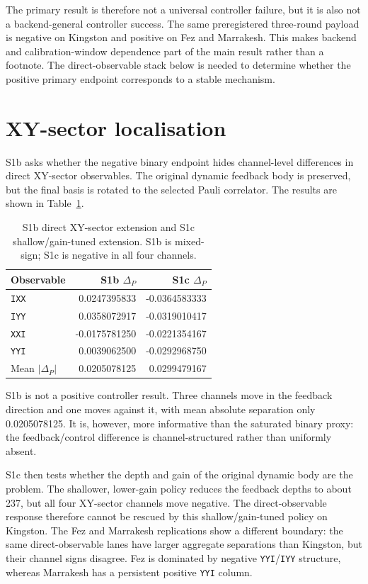 \documentclass[preprint,aps,physrev,superscriptaddress,floatfix,longbibliography]{revtex4-2}
\begin{document}
The primary result is therefore not a universal controller failure, but it is
also not a backend-general controller success. The same preregistered
three-round payload is negative on Kingston and positive on Fez and
Marrakesh. This makes backend and calibration-window dependence part of the
main result rather than a footnote. The direct-observable stack below is
needed to determine whether the positive primary endpoint corresponds to a
stable mechanism.

\section{XY-sector localisation}

S1b asks whether the negative binary endpoint hides channel-level differences
in direct XY-sector observables. The original dynamic feedback body is
preserved, but the final basis is rotated to the selected Pauli correlator.
The results are shown in Table~\ref{tab:s1bc}.

\begin{table}[tb]
\centering
\begin{tabular}{lrr}
\toprule
Observable & S1b $\Delta_P$ & S1c $\Delta_P$ \\
\midrule
\texttt{IXX} & 0.0247395833 & -0.0364583333 \\
\texttt{IYY} & 0.0358072917 & -0.0319010417 \\
\texttt{XXI} & -0.0175781250 & -0.0221354167 \\
\texttt{YYI} & 0.0039062500 & -0.0292968750 \\
\midrule
Mean $|\Delta_P|$ & 0.0205078125 & 0.0299479167 \\
\bottomrule
\end{tabular}
\caption{S1b direct XY-sector extension and S1c shallow/gain-tuned extension.
S1b is mixed-sign; S1c is negative in all four channels.}
\label{tab:s1bc}
\end{table}

S1b is not a positive controller result. Three channels move in the feedback
direction and one moves against it, with mean absolute separation only
0.0205078125. It is, however, more informative than the saturated binary
proxy: the feedback/control difference is channel-structured rather than
uniformly absent.

S1c then tests whether the depth and gain of the original dynamic body are the
problem. The shallower, lower-gain policy reduces the feedback depths to about
237, but all four XY-sector channels move negative. The direct-observable
response therefore cannot be rescued by this shallow/gain-tuned policy on
Kingston. The Fez and Marrakesh replications show a different boundary: the
same direct-observable lanes have larger aggregate separations than Kingston,
but their channel signs disagree. Fez is dominated by negative
\texttt{YYI}/\texttt{IYY} structure, whereas Marrakesh has a persistent
positive \texttt{YYI} column.
\end{document}
